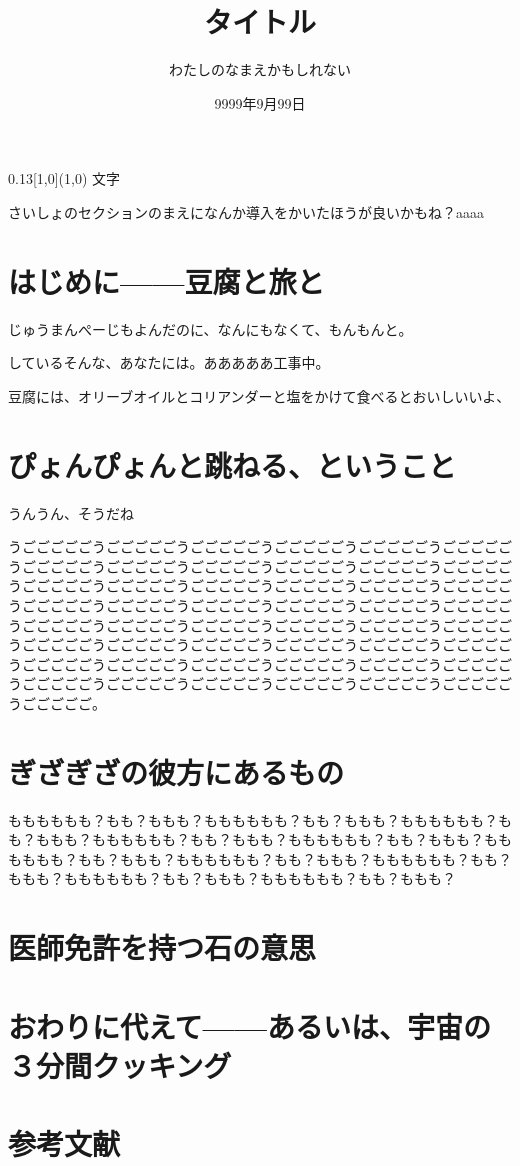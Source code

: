 \documentclass[a4paper,12pt]{article}
\title{\vspace{-2cm}タイトル}
\author{わたしのなまえかもしれない}
\date{9999年9月99日}
\begin{document}


\maketitle
{}
\begin{textblock}{0.13}[1,0](1,0)
    文字
\end{textblock}


さいしょのセクションのまえになんか導入をかいたほうが良いかもね？aaaa

\section{はじめに------豆腐と旅と}

じゅうまんぺーじもよんだのに、なんにもなくて、もんもんと。

しているそんな、あなたには。あああああ工事中。

豆腐には、オリーブオイルとコリアンダーと塩をかけて食べるとおいしいいよ、

\section{ぴょんぴょんと跳ねる、ということ}

うんうん、そうだね

うごごごごごうごごごごごうごごごごごうごごごごごうごごごごごうごごごごごうごごごごごうごごごごごうごごごごごうごごごごごうごごごごごうごごごごごうごごごごごうごごごごごうごごごごごうごごごごごうごごごごごうごごごごごうごごごごごうごごごごごうごごごごごうごごごごごうごごごごごうごごごごごうごごごごごうごごごごごうごごごごごうごごごごごうごごごごごうごごごごごうごごごごごうごごごごごうごごごごごうごごごごごうごごごごごうごごごごごうごごごごごうごごごごごうごごごごごうごごごごごうごごごごごうごごごごごうごごごごごうごごごごごうごごごごごうごごごごごうごごごごごうごごごごごうごごごごご。

\section{ぎざぎざの彼方にあるもの}

もももももも？もも？ももも？もももももも？もも？ももも？もももももも？もも？ももも？もももももも？もも？ももも？もももももも？もも？ももも？もももももも？もも？ももも？もももももも？もも？ももも？もももももも？もも？ももも？もももももも？もも？ももも？もももももも？もも？ももも？

\section{医師免許を持つ石の意思}

\section{おわりに代えて------あるいは、宇宙の３分間クッキング}

\newpage

\section*{参考文献}

\thebib
\end{document}
